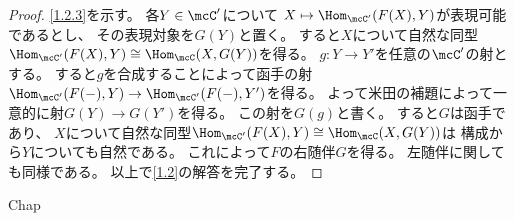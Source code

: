 \documentclass[uplatex,dvipdfmx]{jsarticle}
\begin{document}
\begin{proof}
  \ref{1.2.3}を示す。
  各\(Y\in \mcC'\)について
  \(X\mapsto \Hom_{\mcC'}(F(X),Y)\)が表現可能であるとし、
  その表現対象を\(G(Y)\)と置く。
  すると\(X\)について自然な同型
  \(\Hom_{\mcC'}(F(X),Y)\cong \Hom_{\mcC}(X,G(Y))\)を得る。
  \(g:Y\to Y'\)を任意の\(\mcC'\)の射とする。
  すると\(g\)を合成することによって函手の射
  \(\Hom_{\mcC'}(F(-),Y) \to \Hom_{\mcC'}(F(-),Y')\)を得る。
  よって米田の補題によって一意的に射\(G(Y)\to G(Y')\)を得る。
  この射を\(G(g)\)と書く。
  すると\(G\)は函手であり、
  \(X\)について自然な同型\(\Hom_{\mcC'}(F(X),Y)\cong \Hom_{\mcC}(X,G(Y))\)は
  構成から\(Y\)についても自然である。
  これによって\(F\)の右随伴\(G\)を得る。
  左随伴に関しても同様である。
  以上で\autoref{1.2}の解答を完了する。
\end{proof}



\ifcsname Chap\endcsname\else
\printbibliography
\end{document}
